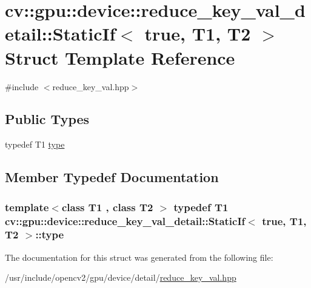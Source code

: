 \hypertarget{structcv_1_1gpu_1_1device_1_1reduce__key__val__detail_1_1StaticIf_3_01true_00_01T1_00_01T2_01_4}{\section{cv\-:\-:gpu\-:\-:device\-:\-:reduce\-\_\-key\-\_\-val\-\_\-detail\-:\-:Static\-If$<$ true, T1, T2 $>$ Struct Template Reference}
\label{structcv_1_1gpu_1_1device_1_1reduce__key__val__detail_1_1StaticIf_3_01true_00_01T1_00_01T2_01_4}
}


{\ttfamily \#include $<$reduce\-\_\-key\-\_\-val.\-hpp$>$}

\subsection*{Public Types}
\begin{DoxyCompactItemize}
\item 
typedef T1 \hyperlink{structcv_1_1gpu_1_1device_1_1reduce__key__val__detail_1_1StaticIf_3_01true_00_01T1_00_01T2_01_4_ae82f0beb7fa469571389e209bdd5eee5}{type}
\end{DoxyCompactItemize}


\subsection{Member Typedef Documentation}
\hypertarget{structcv_1_1gpu_1_1device_1_1reduce__key__val__detail_1_1StaticIf_3_01true_00_01T1_00_01T2_01_4_ae82f0beb7fa469571389e209bdd5eee5}{
\subsubsection[{type}]{\setlength{\rightskip}{0pt plus 5cm}template$<$class T1 , class T2 $>$ typedef T1 {\bf cv\-::gpu\-::device\-::reduce\-\_\-key\-\_\-val\-\_\-detail\-::\-Static\-If}$<$ {\bf true}, T1, T2 $>$\-::{\bf type}}}\label{structcv_1_1gpu_1_1device_1_1reduce__key__val__detail_1_1StaticIf_3_01true_00_01T1_00_01T2_01_4_ae82f0beb7fa469571389e209bdd5eee5}


The documentation for this struct was generated from the following file\-:\begin{DoxyCompactItemize}
\item 
/usr/include/opencv2/gpu/device/detail/\hyperlink{reduce__key__val_8hpp}{reduce\-\_\-key\-\_\-val.\-hpp}\end{DoxyCompactItemize}
